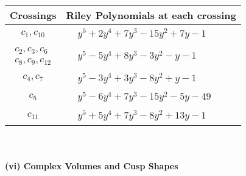 \documentclass[1p]{elsarticle_modified}
\theoremstyle{definition}
\begin{document}
\begin{tabular}{m{50pt}|m{274pt}}
Crossings & \hspace{64pt}Riley Polynomials at each crossing \\
\hline $$\begin{aligned}c_{1},c_{10}\end{aligned}$$&$\begin{aligned}
&y^5+2 y^4+7 y^3-15 y^2+7 y-1
\end{aligned}$\\
\hline $$\begin{aligned}c_{2},c_{3},c_{6}\\c_{8},c_{9},c_{12}\end{aligned}$$&$\begin{aligned}
&y^5-5 y^4+8 y^3-3 y^2- y-1
\end{aligned}$\\
\hline $$\begin{aligned}c_{4},c_{7}\end{aligned}$$&$\begin{aligned}
&y^5-3 y^4+3 y^3-8 y^2+y-1
\end{aligned}$\\
\hline $$\begin{aligned}c_{5}\end{aligned}$$&$\begin{aligned}
&y^5-6 y^4+7 y^3-15 y^2-5 y-49
\end{aligned}$\\
\hline $$\begin{aligned}c_{11}\end{aligned}$$&$\begin{aligned}
&y^5+5 y^4+7 y^3-8 y^2+13 y-1
\end{aligned}$\\
\hline
\end{tabular}\\~\\
\newpage\flushleft \textbf{(vi) Complex Volumes and Cusp Shapes}
\end{document}
